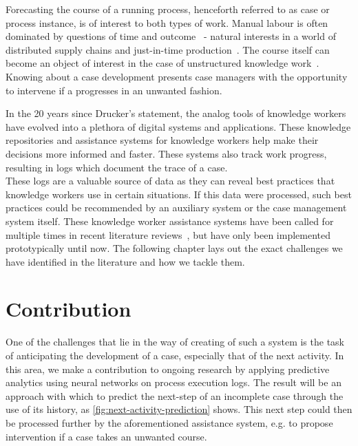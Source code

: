 Forecasting the course of a running process, henceforth referred to as case or process instance, is of interest to both types of work. Manual labour is often dominated by questions of time and outcome~\cite{rogge2013} - natural interests in a world of distributed supply chains and just-in-time production~\cite{web:economist:jit}. The course itself can become an object of interest in the case of unstructured knowledge work~\cite{francescomarino2015}. Knowing about a case development presents case managers with the opportunity to intervene if a progresses in an unwanted fashion.

In the 20 years since Drucker's statement, the analog tools of knowledge workers have evolved into a plethora of digital systems and applications. These knowledge repositories and assistance systems for knowledge workers help make their decisions more informed and faster. These systems also track work progress, resulting in logs which document the trace of a case.\\

These logs are a valuable source of data as they can reveal best practices that knowledge workers use in certain situations. If this data were processed, such best practices could be recommended by an auxiliary system or the case management system itself. These knowledge worker assistance systems have been called for multiple times in recent literature reviews~\cite{hauder2014, francescomarino2018}, but have only been implemented prototypically until now. The following chapter lays out the exact challenges we have identified in the literature and how we tackle them.

\section{Contribution}\label{sec:intro:contribution}
One of the challenges that lie in the way of creating of such a system is the task of anticipating the development of a case, especially that of the next activity. In this area, we make a contribution to ongoing research by applying predictive analytics using neural networks on process execution logs. The result will be an approach with which to predict the next-step of an incomplete case through the use of its history, as \autoref{fig:next-activity-prediction} shows. This next step could then be processed further by the aforementioned assistance system, e.g. to propose intervention if a case takes an unwanted course.\\

